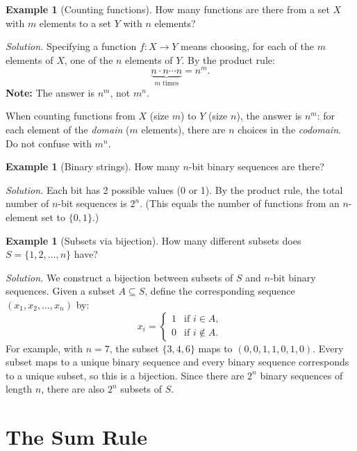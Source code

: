 \documentclass[11pt, a4paper, notitlepage]{report}
\theoremstyle{definition}
\newtheorem{example}[theorem]{Example}
\theoremstyle{remark}
\begin{document}
\begin{example}[Counting functions]
How many functions are there from a set $X$ with $m$ elements to a set $Y$ with $n$ elements?

\textit{Solution.} Specifying a function $f: X \to Y$ means choosing, for each of the $m$
elements of $X$, one of the $n$ elements of $Y$. By the product rule:
\[
  \underbrace{n \cdot n \cdots n}_{m \text{ times}} = n^m.
\]
\textbf{Note:} The answer is $n^m$, not $m^n$.
\end{example}

\begin{examtip}[title={Exam Tip: $n^m$ vs $m^n$}]
When counting functions from $X$ (size $m$) to $Y$ (size $n$), the answer is $n^m$: for each
element of the \emph{domain} ($m$ elements), there are $n$ choices in the \emph{codomain}.
Do not confuse with $m^n$.
\end{examtip}

\begin{example}[Binary strings]
How many $n$-bit binary sequences are there?

\textit{Solution.} Each bit has 2 possible values (0 or 1). By the product rule, the total
number of $n$-bit sequences is $2^n$. (This equals the number of functions from an $n$-element
set to $\{0, 1\}$.)
\end{example}

\begin{example}[Subsets via bijection]
\label{ex:subsets}
How many different subsets does $S = \{1, 2, \ldots, n\}$ have?

\textit{Solution.} We construct a bijection between subsets of $S$ and $n$-bit binary
sequences. Given a subset $A \subseteq S$, define the corresponding sequence
$(x_1, x_2, \ldots, x_n)$ by:
\[
  x_i = \begin{cases} 1 & \text{if } i \in A, \\ 0 & \text{if } i \notin A. \end{cases}
\]
For example, with $n = 7$, the subset $\{3, 4, 6\}$ maps to $(0, 0, 1, 1, 0, 1, 0)$. Every
subset maps to a unique binary sequence and every binary sequence corresponds to a unique
subset, so this is a bijection. Since there are $2^n$ binary sequences of length $n$, there
are also $2^n$ subsets of $S$.
\end{example}

\section{The Sum Rule}
\end{document}
